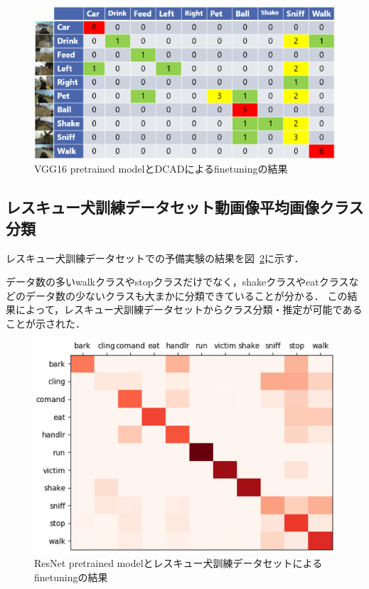 \begin{figure}[htbp]
   \begin{center}

    \includegraphics[scale=0.5]{./Figures/vgg16_res.eps}
    \caption{VGG16 pretrained modelとDCADによるfinetuningの結果}
    \label{vgg16_res}
   \end{center}
\end{figure}

\subsection{レスキュー犬訓練データセット動画像平均画像クラス分類}
レスキュー犬訓練データセットでの予備実験の結果を図~\ref{sub_resque_res}に示す．

データ数の多いwalkクラスやstopクラスだけでなく，shakeクラスやeatクラスなどのデータ数の少ないクラスも大まかに分類できていることが分かる．
この結果によって，レスキュー犬訓練データセットからクラス分類・推定が可能であることが示された．
\begin{figure}[htbp]
  \begin{center}
    \includegraphics[scale=0.5]{./Figures/resque_mean_result.eps}
    \caption{ResNet pretrained modelとレスキュー犬訓練データセットによるfinetuningの結果}
    \label{sub_resque_res}
  \end{center}
\end{figure}

